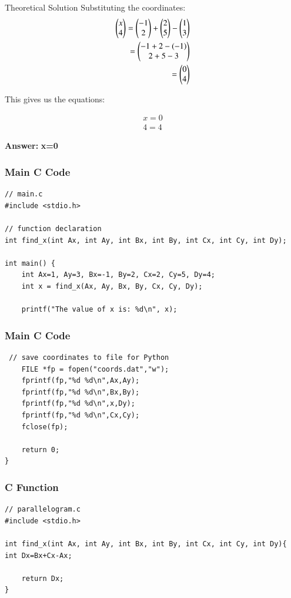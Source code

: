 \documentclass{beamer}
\begin{document}
\begin{frame}{Theoretical Solution}
Substituting the coordinates:
\begin{align}
\begin{pmatrix} x \\ 4 \end{pmatrix} = \begin{pmatrix} -1 \\ 2 \end{pmatrix} + \begin{pmatrix} 2 \\ 5 \end{pmatrix} - \begin{pmatrix} 1 \\ 3 \end{pmatrix} \\
                 = \begin{pmatrix} -1 + 2 - (-1) \\ 2 + 5 - 3 \end{pmatrix} \\
                 = \begin{pmatrix} 0 \\ 4 \end{pmatrix}
\end{align}

This gives us the equations: 

\begin{align}
    x=0  \\
    4=4
\end{align}

\textbf{Answer:}  
\textbf{x=0}
\end{frame}

\begin{frame}[fragile]
\frametitle{Main C Code}
   \begin{lstlisting}
// main.c
#include <stdio.h>

// function declaration
int find_x(int Ax, int Ay, int Bx, int By, int Cx, int Cy, int Dy);

int main() {
    int Ax=1, Ay=3, Bx=-1, By=2, Cx=2, Cy=5, Dy=4;
    int x = find_x(Ax, Ay, Bx, By, Cx, Cy, Dy);

    printf("The value of x is: %d\n", x);

\end{lstlisting}
	\end{frame}

\begin{frame}[fragile]
\frametitle{Main C Code}
   \begin{lstlisting}
 // save coordinates to file for Python
    FILE *fp = fopen("coords.dat","w");
    fprintf(fp,"%d %d\n",Ax,Ay);
    fprintf(fp,"%d %d\n",Bx,By);
    fprintf(fp,"%d %d\n",x,Dy);
    fprintf(fp,"%d %d\n",Cx,Cy);
    fclose(fp);

    return 0;
}
\end{lstlisting}
	\end{frame}

\begin{frame}[fragile]
\frametitle{C Function}
   \begin{lstlisting}
// parallelogram.c
#include <stdio.h>

int find_x(int Ax, int Ay, int Bx, int By, int Cx, int Cy, int Dy){
int Dx=Bx+Cx-Ax;

    return Dx;
}
\end{lstlisting}
\end{frame}
\end{document}
